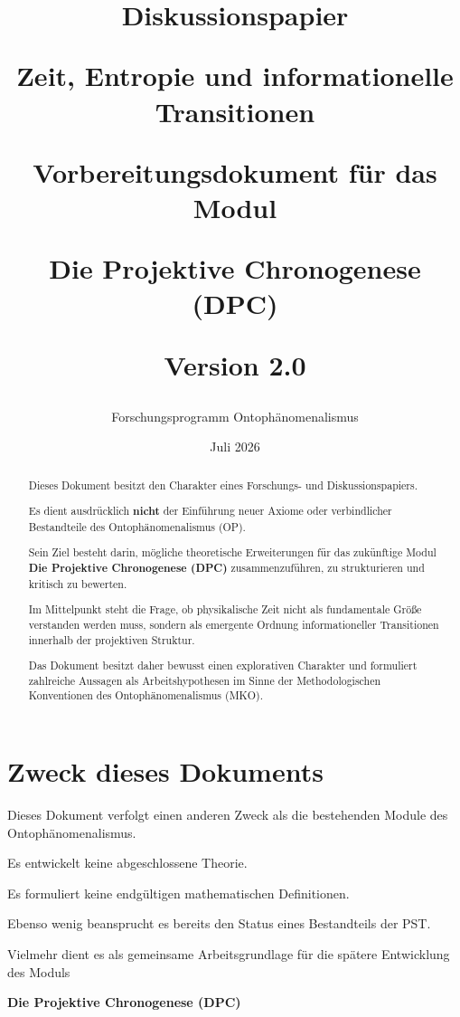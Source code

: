 \documentclass[11pt,a4paper]{article}
\title{

\textbf{Diskussionspapier}

\vspace{0.4cm}

\textbf{Zeit, Entropie und informationelle Transitionen}

\vspace{0.4cm}

Vorbereitungsdokument für das Modul

\textbf{Die Projektive Chronogenese (DPC)}

\vspace{0.4cm}

Version 2.0

}
\author{

Forschungsprogramm Ontophänomenalismus

}
\date{Juli 2026}
\begin{document}
\maketitle


\begin{abstract}

Dieses Dokument besitzt den Charakter eines Forschungs- und
Diskussionspapiers.

Es dient ausdrücklich \textbf{nicht} der Einführung neuer
Axiome oder verbindlicher Bestandteile des
Ontophänomenalismus (OP).

Sein Ziel besteht darin, mögliche theoretische Erweiterungen
für das zukünftige Modul
\textbf{Die Projektive Chronogenese (DPC)}
zusammenzuführen, zu strukturieren und kritisch zu bewerten.

Im Mittelpunkt steht die Frage, ob physikalische Zeit
nicht als fundamentale Größe verstanden werden muss,
sondern als emergente Ordnung informationeller
Transitionen innerhalb der projektiven Struktur.

Das Dokument besitzt daher bewusst einen explorativen
Charakter und formuliert zahlreiche Aussagen als
Arbeitshypothesen im Sinne der Methodologischen
Konventionen des Ontophänomenalismus (MKO).

\end{abstract}

\tableofcontents

\newpage

\section{Zweck dieses Dokuments}

Dieses Dokument verfolgt einen anderen Zweck als die
bestehenden Module des Ontophänomenalismus.

Es entwickelt keine abgeschlossene Theorie.

Es formuliert keine endgültigen mathematischen Definitionen.

Ebenso wenig beansprucht es bereits den Status eines
Bestandteils der PST.

Vielmehr dient es als gemeinsame Arbeitsgrundlage für die
spätere Entwicklung des Moduls

\begin{center}

\textbf{Die Projektive Chronogenese (DPC)}

\end{center}
\end{document}
